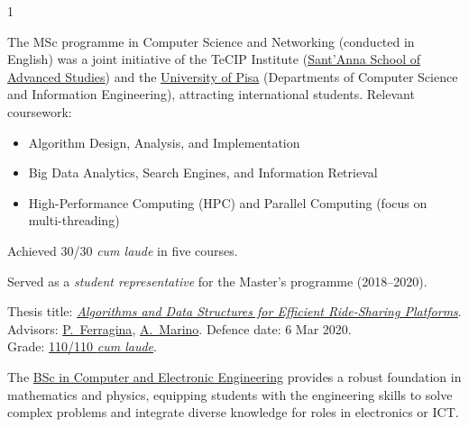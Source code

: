 \documentclass[10pt,a4paper,ragged2e,academicons]{altacv}
\newif\ifshortcv
\newcommand{\longonly}[1]{\ifshortcv\else#1\fi}%
\begin{document}
\begin{paracol}{1}
\divider


\ifshortcv\else%
The MSc programme in Computer Science and Networking (conducted in English) was a joint initiative of the TeCIP Institute (\href{https://web.archive.org/web/20170703072910/www.santannapisa.it/it/formazione/masters-degree-computer-science-and-networking}{Sant'Anna School of Advanced Studies}) and the \href{https://didattica.di.unipi.it/laurea-magistrale-in-informatica-e-networking/}{University of Pisa} (Departments of Computer Science and Information Engineering), attracting international students.
\longonly{Relevant coursework:
\begin{itemize}
    \item Algorithm Design, Analysis, and Implementation
    \item Big Data Analytics, Search Engines, and Information Retrieval
    \item High-Performance Computing (HPC) and Parallel Computing (focus on multi-threading)
\end{itemize}}

\smallskip

Achieved 30/30 \textit{cum laude} in five courses.

Served as a {\em student representative} for the Master's programme (2018--2020).

\smallskip
\fi

{\sc Thesis title:} {\em \href{https://etd.adm.unipi.it/t/etd-02112020-105128/}{Algorithms and Data Structures for Efficient Ride-Sharing Platforms}}.\\ Advisors: \href{https://www.santannapisa.it/en/paolo-ferragina}{P.~Ferragina}, \href{https://pages.di.unipi.it/marino/}{A.~Marino}. Defence date: 6 Mar 2020.\\ Grade: \href{https://www.francescotosoni.it/static/msc_diploma_supplement.pdf}{110/110 \textit{cum laude}}.

\divider


\ifshortcv\else%
The \href{https://www.unipg.it/didattica/corsi-di-laurea-e-laurea-magistrale/archivio/offerta-formativa-2017-18?view=elenco&ricerca=on&annoregolamento=2014&dipartimento=516600&lingua=&nomecorso=&tipocorso=L&sede=&classe=&cerca=&idcorso=196&idpds=&tab=}{BSc in Computer and Electronic Engineering} provides a robust foundation in mathematics and physics, equipping students with the engineering skills to solve complex problems and integrate diverse knowledge for roles in electronics or ICT.


\end{paracol}
\end{document}
